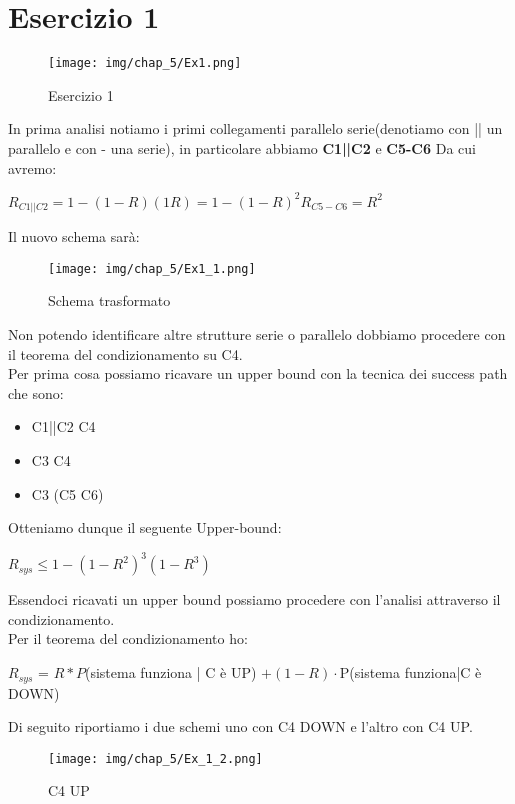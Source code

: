 \section{Esercizio 1}
\begin{figure}[H]
    \centering
    \texttt{[image: img/chap\_5/Ex1.png]}
    \caption{Esercizio 1}
    \label{fig:Ex_1}
\end{figure}
\noindent
In prima analisi notiamo i primi collegamenti parallelo serie(denotiamo con || un parallelo e con - una serie), in particolare abbiamo \textbf{C1||C2} e \textbf{C5-C6}
Da cui avremo:
\begin{center}
    $
        R_{C1||C2} = 1−(1−R)(1R) = 1−(1−R)^2 
        R_{C5-C6} = R^2
    $
\end{center} 
Il nuovo schema sarà:
\begin{figure}[H]
    \centering
    \texttt{[image: img/chap\_5/Ex1\_1.png]}
    \caption{Schema trasformato}
    \label{fig:Ex_1_1}
\end{figure}
\noindent
Non potendo identificare altre strutture serie o parallelo dobbiamo procedere con il teorema del condizionamento su C4.\\
Per prima cosa possiamo ricavare un upper bound con la tecnica dei success path che sono:
\begin{itemize}
    \item C1||C2 \textminus{} C4
    \item C3 \textminus{} C4
    \item C3 \textminus{} (C5 \textminus{} C6)
\end{itemize}
Otteniamo dunque il seguente Upper-bound:
\begin{center}
    $
        R_{sys} \leq 1-(1-R^2)^3(1-R^3)
    $
\end{center}
Essendoci ricavati un upper bound possiamo procedere con l'analisi attraverso il condizionamento.\\
Per il teorema del condizionamento ho:\\
\begin{center}
    $R_{sys}$ = $R*P$(sistema funziona | C è UP) $+ (1-R) \cdot $P(sistema funziona|C è DOWN)
\end{center}
Di seguito riportiamo i due schemi uno con C4 DOWN e l'altro con C4 UP.\\
\begin{figure}[H]
    \centering
    \texttt{[image: img/chap\_5/Ex\_1\_2.png]}
    \caption{C4 UP}
    \label{fig:Ex_1_2}
\end{figure}
